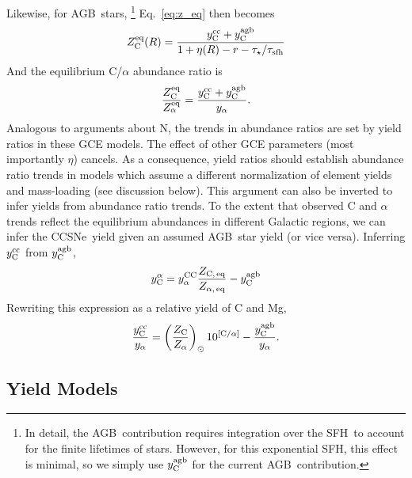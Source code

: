 \documentclass[fleqn,usenatbib]{mnras}
\newcommand{\cc}{CCSNe}
\newcommand{\agb}{AGB}
\newcommand{\sfh}{SFH}
\newcommand{\imf}{IMF}
\newcommand{\gce}{GCE}
\newcommand{\Ycc}{\ensuremath{y_{\rm C}^{\rm cc}}}
\newcommand{\Ycagb}{\ensuremath{y_{\rm C}^{\rm agb}}}
\begin{document}
Likewise, for \agb\ stars,%
\footnote{In detail, the \agb\ contribution requires integration over the \sfh\ to account for the finite lifetimes of stars. However, for this exponential \sfh, this effect is minimal, so we simply use $\Ycagb$ for the current \agb\ contribution.}
Eq.~\ref{eq:z_eq} then becomes
\begin{equation}
    Z_{\rm C}^{\rm eq}(R) = \frac{\Ycc + \Ycagb}{1 + \eta(R) - r - \tau_\star / \tau_{\rm sfh}}
\end{equation}
And the equilibrium C/$\alpha$ abundance ratio is
\begin{equation}\label{eq:z_co}
    \frac{Z_{\rm C}^{\rm eq}}{Z_\alpha^{\rm eq}} = \frac{\Ycc + \Ycagb }{y_\alpha}.
\end{equation}
Analogous to \cite{james+23} arguments about N, the trends in abundance ratios are set by yield ratios in these \gce{} models. The effect of other \gce{} parameters (most importantly $\eta$) cancels. As a consequence, yield ratios should establish abundance ratio trends in models which assume a different normalization of element yields and mass-loading (see discussion below).
This argument can also be inverted to infer  yields from abundance ratio trends. To the extent that observed C and $\alpha$ trends reflect the equilibrium abundances in different Galactic regions, we can infer the \cc\ yield given an assumed \agb\ star yield (or vice versa). Inferring $\Ycc$ from $\Ycagb$, 
\begin{equation}
    y_\text{C}^\alpha =  y_\alpha^\text{CC} \frac{Z_\text{C,\,eq}}{Z_{\alpha,\,{\rm eq}}} - \Ycagb
\end{equation}
Rewriting this expression as a relative yield of C and Mg,
\begin{equation}\label{eq:y_c_eq}
    \frac{\Ycc}{y_\alpha} = \left(\frac{Z_{\text{C}}}{Z_{\alpha}}\right)_\odot 10^{[{\rm C}/\alpha]} - \frac{\Ycagb}{y_\alpha}.
\end{equation}

\footnotetext{$r\approx0.4$ for a \citealt{kroupa01} \imf.}


\subsection{Yield Models}
\end{document}
